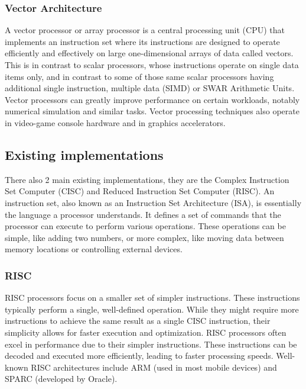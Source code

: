 \documentclass[9pt,a4paper,twoside]{tau}
\begin{document}
        \subsubsection{Vector Architecture}
        A vector processor or array processor is a central processing unit (CPU) that implements an instruction set where its instructions are designed to operate efficiently and effectively on large one-dimensional arrays of data called vectors. This is in contrast to scalar processors, whose instructions operate on single data items only, and in contrast to some of those same scalar processors having additional single instruction, multiple data (SIMD) or SWAR Arithmetic Units. Vector processors can greatly improve performance on certain workloads, notably numerical simulation and similar tasks. Vector processing techniques also operate in video-game console hardware and in graphics accelerators.

        
        




    
    \subsection{Existing implementations}
    There also 2 main existing implementations, they are the Complex Instruction Set Computer (CISC) and Reduced Instruction Set Computer (RISC). An instruction set, also known as an Instruction Set Architecture (ISA), is essentially the language a processor understands. It defines a set of commands that the processor can execute to perform various operations. These operations can be simple, like adding two numbers, or more complex, like moving data between memory locations or controlling external devices.

        \subsubsection{RISC}
        RISC processors focus on a smaller set of simpler instructions. These instructions typically perform a single, well-defined operation. While they might require more instructions to achieve the same result as a single CISC instruction, their simplicity allows for faster execution and optimization. RISC processors often excel in performance due to their simpler instructions. These instructions can be decoded and executed more efficiently, leading to faster processing speeds.
        Well-known RISC architectures include ARM (used in most mobile devices) and SPARC (developed by Oracle).
\end{document}
